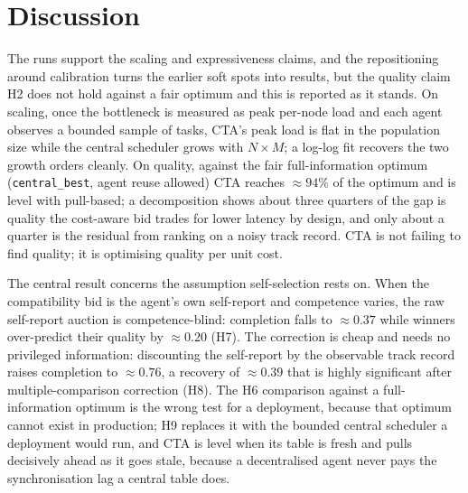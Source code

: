 \documentclass[11pt]{article}
\newcommand{\code}[1]{\texttt{#1}}
\begin{document}
\section{Discussion}

The runs support the scaling and expressiveness claims, and the repositioning around calibration turns the earlier soft spots into results, but the quality claim H2 does not hold against a fair optimum and this is reported as it stands. On scaling, once the bottleneck is measured as peak per-node load and each agent observes a bounded sample of tasks, CTA's peak load is flat in the population size while the central scheduler grows with $N\times M$; a log-log fit recovers the two growth orders cleanly. On quality, against the fair full-information optimum (\code{central\_best}, agent reuse allowed) CTA reaches $\approx 94\%$ of the optimum and is level with pull-based; a decomposition shows about three quarters of the gap is quality the cost-aware bid trades for lower latency by design, and only about a quarter is the residual from ranking on a noisy track record. CTA is not failing to find quality; it is optimising quality per unit cost.

The central result concerns the assumption self-selection rests on. When the compatibility bid is the agent's own self-report and competence varies, the raw self-report auction is competence-blind: completion falls to $\approx 0.37$ while winners over-predict their quality by $\approx 0.20$ (H7). The correction is cheap and needs no privileged information: discounting the self-report by the observable track record raises completion to $\approx 0.76$, a recovery of $\approx 0.39$ that is highly significant after multiple-comparison correction (H8). The H6 comparison against a full-information optimum is the wrong test for a deployment, because that optimum cannot exist in production; H9 replaces it with the bounded central scheduler a deployment would run, and CTA is level when its table is fresh and pulls decisively ahead as it goes stale, because a decentralised agent never pays the synchronisation lag a central table does.
\end{document}
